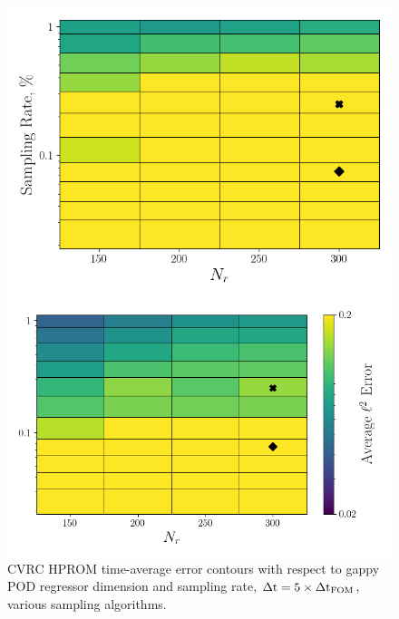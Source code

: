\begin{figure}
	\begin{minipage}{0.46\linewidth}
		\includegraphics[width=0.99\linewidth]{Chapters/HPROMResults/Images/cvrc/deim/err_contour_gnat1_dt5e-7.png}
	\end{minipage}
	\begin{minipage}{0.53\linewidth}
		\includegraphics[width=0.99\linewidth]{Chapters/HPROMResults/Images/cvrc/deim/err_contour_gnat2_dt5e-7.png}
	\end{minipage}
	\caption{\label{fig:cvrcSampledROMErrContourDt5e-7}CVRC HPROM time-average error contours with respect to gappy POD regressor dimension and sampling rate, $\Delta \text{t} = 5 \times \Delta \text{t}_{\text{FOM}}$, various sampling algorithms.}
\end{figure}

